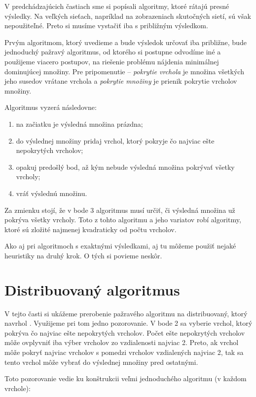 V predchádzajúcich častiach sme si popísali algoritmy, ktoré rátajú presné 
výsledky. Na veľkých sieťach, napríklad na zobrazeniach skutočných sietí, 
sú však nepoužiteľné. Preto si musíme vystačiť iba s približným výsledkom. 

Prvým algoritmom, ktorý uvedieme a bude výsledok určovať iba približne, bude 
jednoduchý pažravý algoritmus, od ktorého si postupne odvodíme iné a použijeme 
viacero postupov, na riešenie problému nájdenia minimálnej dominujúcej množiny. 
Pre pripomenutie -- \emph{pokrytie vrchola} je množina všetkých jeho susedov 
vrátane vrchola a \emph{pokrytie množiny} je prienik pokrytie vrcholov množiny. 

Algoritmus vyzerá následovne:
\begin{enumerate}
	\item na začiatku je výsledná množina prázdna;
	\item do výslednej množiny pridaj vrchol, ktorý pokryje čo najviac ešte 
		nepokrytých vrcholov;
	\item opakuj predošlý bod, až kým nebude výsledná množina pokrývať všetky 
		vrcholy;
	\item vráť výslednú množinu.
\end{enumerate}

Za zmienku stojí, že v bode 3 algoritmus musí určiť, či výsledná množina už 
pokrýva všetky vrcholy. Toto z tohto algoritmu a jeho variatov robí algoritmy, 
ktoré sú zložité najmenej kvadraticky od počtu vrcholov.

Ako aj pri algoritmoch s exaktnými výsledkami, aj tu môžeme použiť nejaké 
heuristiky na druhý krok. O tých si povieme neskôr.

\section{Distribuovaný algoritmus}

V tejto časti si ukážeme prerobenie pažravého algoritmu na distribuovaný, ktorý 
navrhol \citet{chapS}. 
Využijeme pri tom jedno pozorovanie. V bode 2 sa vyberie vrchol, ktorý pokrýva 
čo najviac ešte nepokrytých vrcholov. Počet ešte nepokrytých vrcholov môže 
ovplyvniť iba výber vrcholov zo vzdialenosti najviac 2. Preto, ak vrchol môže 
pokryť najviac vrcholov s pomedzi vrcholov vzdialených najviac 2, tak sa tento 
vrchol môže vybrať do výslednej množiny pred ostatnými. 

Toto pozorovanie vedie ku konštrukcii veľmi jednoduchého algoritmu (v každom 
vrchole):

